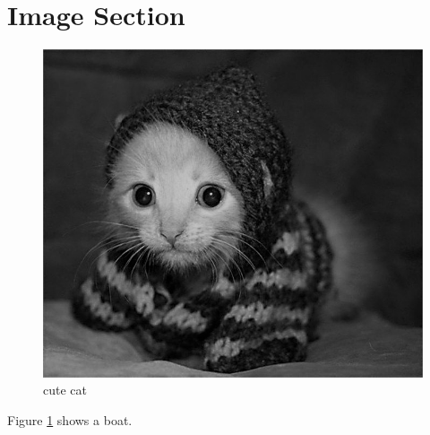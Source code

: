 \documentclass{article}
\begin{document}
\newpage

\section{Image Section}
\begin{figure}[h!]

\centering
\includegraphics[width=0.7\linewidth]{profile2.jpg}
\caption{cute cat}
\label{fig:cat}
\end{figure}

Figure \ref{fig:cat} shows a boat.
\end{document}
